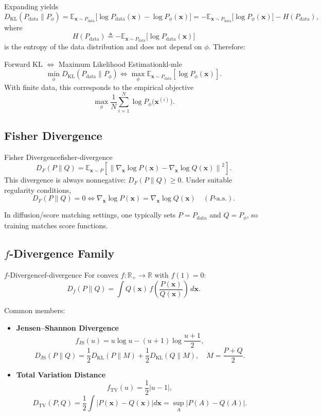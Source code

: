\documentclass[11pt,a4paper]{article}
\newcommand{\bx}{\mathbf{x}}
\begin{document}
Expanding yields
\[
D_{\mathrm{KL}}(P_{\mathrm{data}}\parallel P_\phi)
=\mathbb{E}_{\bx\sim P_{\mathrm{data}}}
\big[\log P_{\mathrm{data}}(\bx)-\log P_\phi(\bx)\big]
=-\mathbb{E}_{\bx\sim P_{\mathrm{data}}}\big[\log P_\phi(\bx)\big]-H(P_{\mathrm{data}}),
\]
where
\[
H(P_{\mathrm{data}})
\triangleq -\mathbb{E}_{\bx\sim P_{\mathrm{data}}}\big[\log P_{\mathrm{data}}(\bx)\big]
\]
is the entropy of the data distribution and does not depend on $\phi$. Therefore:

\begin{dgmthm}{Forward KL $\Longleftrightarrow$ Maximum Likelihood Estimation}{kl-mle}
\[
\min_\phi D_{\mathrm{KL}}(P_{\mathrm{data}}\parallel P_\phi)
\Longleftrightarrow
\max_\phi \mathbb{E}_{\bx\sim P_{\mathrm{data}}}[\log P_\phi(\bx)].
\]
With finite data, this corresponds to the empirical objective
\[
\max_\phi \frac{1}{N}\sum_{i=1}^{N}\log P_\phi\!\big(\bx^{(i)}\big).
\]
\end{dgmthm}

\subsection{Fisher Divergence}

\begin{dgmdef}{Fisher Divergence}{fisher-divergence}
\[
D_F(P\parallel Q)
=\mathbb{E}_{\bx\sim P}
\left[\left\|\nabla_{\bx}\log P(\bx)-\nabla_{\bx}\log Q(\bx)\right\|^2\right].
\]
This divergence is always nonnegative: $D_F(P\parallel Q)\ge 0$. Under suitable regularity conditions,
\[
D_F(P\parallel Q)=0 \iff \nabla_{\bx}\log P(\bx)=\nabla_{\bx}\log Q(\bx)\quad (P\text{-a.s.}).
\]
\end{dgmdef}

In diffusion/score matching settings, one typically sets $P=P_{\mathrm{data}}$ and $Q=P_\phi$, so training matches score functions.

\subsection{$f$-Divergence Family}

\begin{dgmdef}{$f$-Divergence}{f-divergence}
For convex $f:\mathbb{R}_+\to\mathbb{R}$ with $f(1)=0$:
\[
D_f(P\parallel Q)=\int Q(\bx)\,f\!\left(\frac{P(\bx)}{Q(\bx)}\right)\,d\bx.
\]
\end{dgmdef}

Common members:
\begin{itemize}
  \item \textbf{Jensen--Shannon Divergence}
  \[
  f_{\mathrm{JS}}(u)=u\log u-(u+1)\log\frac{u+1}{2},
  \]
  \[
  D_{\mathrm{JS}}(P\parallel Q)
  =\frac12 D_{\mathrm{KL}}(P\parallel M)+\frac12 D_{\mathrm{KL}}(Q\parallel M),
  \quad M=\frac{P+Q}{2}.
  \]

  \item \textbf{Total Variation Distance}
  \[
  f_{\mathrm{TV}}(u)=\frac12|u-1|,
  \]
  \[
  D_{\mathrm{TV}}(P,Q)
  =\frac12\int\!\left|P(\bx)-Q(\bx)\right|d\bx
  =\sup_A\left|P(A)-Q(A)\right|.
  \]
\end{itemize}
\end{document}
